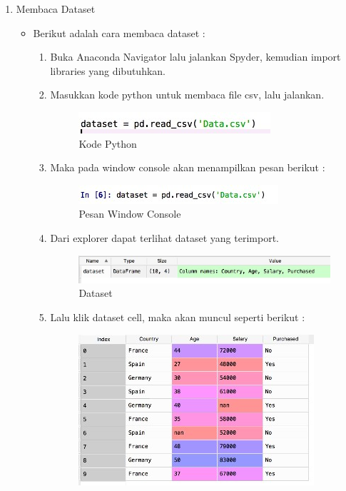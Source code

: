 \begin{enumerate}
\item Membaca Dataset
	\begin{itemize}
	\item Berikut adalah cara membaca dataset :
		\begin{enumerate}
			\item Buka Anaconda Navigator lalu jalankan Spyder, kemudian import libraries yang dibutuhkan.
			\item Masukkan kode python untuk membaca file csv, lalu jalankan.
				\begin{figure}[!hbtp]
				\centering
				\includegraphics[scale=0.8]{figures/j41.jpg}
				\caption{Kode Python}
				\label{contoh}
				\end{figure}
			\item Maka pada window console akan menampilkan pesan berikut :
				\begin{figure}[!hbtp]
				\centering
				\includegraphics[scale=0.9]{figures/j42.jpg}
				\caption{Pesan Window Console}
				\label{contoh}
				\end{figure}
			\item Dari explorer dapat terlihat dataset yang terimport.
				\begin{figure}[!hbtp]
				\centering
				\includegraphics[scale=0.6]{figures/j43.jpg}
				\caption{Dataset}
				\label{contoh}
				\end{figure}
			\item Lalu klik dataset cell, maka akan muncul seperti berikut :
				\begin{figure}[!hbtp]
				\centering
				\includegraphics[scale=0.7]{figures/j44.jpg}

\end{figure}
\end{enumerate}
\end{itemize}
\end{enumerate}
